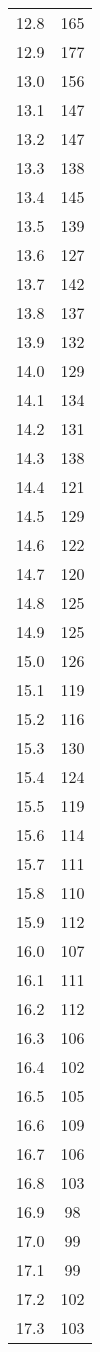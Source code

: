 \begin{tabular}{S[table-format=2.1]S[table-format=4.0]}
		12.8 &  165 \\
		12.9 &  177 \\
		13.0 &  156 \\
		13.1 &  147 \\
		13.2 &  147 \\
		13.3 &  138 \\
		13.4 &  145 \\
		13.5 &  139 \\
		13.6 &  127 \\
		13.7 &  142 \\
		13.8 &  137 \\
		13.9 &  132 \\
		14.0 &  129 \\
		14.1 &  134 \\
		14.2 &  131 \\
		14.3 &  138 \\
		14.4 &  121 \\
		14.5 &  129 \\
		14.6 &  122 \\
		14.7 &  120 \\
		14.8 &  125 \\
		14.9 &  125 \\
		15.0 &  126 \\
		15.1 &  119 \\
		15.2 &  116 \\
		15.3 &  130 \\
		15.4 &  124 \\
		15.5 &  119 \\
		15.6 &  114 \\
		15.7 &  111 \\
		15.8 &  110 \\
		15.9 &  112 \\
		16.0 &  107 \\
		16.1 &  111 \\
		16.2 &  112 \\
		16.3 &  106 \\
		16.4 &  102 \\
		16.5 &  105 \\
		16.6 &  109 \\
		16.7 &  106 \\
		16.8 &  103 \\
		16.9 &   98 \\
		17.0 &   99 \\
		17.1 &   99 \\
		17.2 &  102 \\
		17.3 &  103 \\

\end{tabular}
